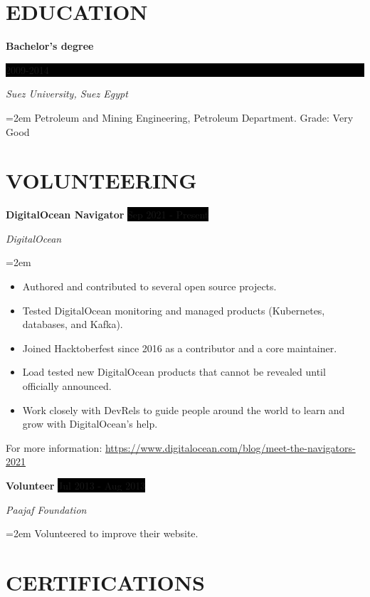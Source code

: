 \documentclass[paper=a4,fontsize=11pt]{scrartcl} %
\newcommand{\sepspace}{\vspace*{1em}}		%
\newcommand{\NewPart}[1]{\section*{\uppercase{#1}}}
\newcommand{\EducationEntry}[4]{
		\noindent \textbf{#1} \hfill      %
		\colorbox{Black}{%
			\parbox{6em}{%
			\hfill\color{White}#2}} \par  %
		\noindent \textit{#3} \par        %
		\noindent\hangindent=2em\hangafter=0 \small #4 %
		\normalsize \par}
\newcommand{\WorkEntry}[4]{				  %
		\noindent \textbf{#1} \hfill      %
		\colorbox{Black}{\color{White}#2} \par  %
		\noindent \textit{#3} \par              %
		\noindent\hangindent=2em\hangafter=0 \small #4 %
		\normalsize \par}
\begin{document}
\NewPart{Education}{}

\EducationEntry{Bachelor's degree}{2009-2014}{Suez University, Suez Egypt}{Petroleum and Mining Engineering, Petroleum Department. Grade: Very Good}


\NewPart{Volunteering}{}

\WorkEntry{DigitalOcean Navigator}{Sep 2021 - Present}{DigitalOcean}{\begin{itemize}
\item Authored and contributed to several open source projects.
\item Tested DigitalOcean monitoring and managed products (Kubernetes, databases, and Kafka).
\item Joined Hacktoberfest since 2016 as a contributor and a core maintainer.
\item Load tested new DigitalOcean products that cannot be revealed until officially announced.
\item Work closely with DevRels to guide people around the world to learn and grow with DigitalOcean's help.
\end{itemize}
For more information: \url{https://www.digitalocean.com/blog/meet-the-navigators-2021}}
\sepspace

\WorkEntry{Volunteer}{Jul 2013 - Aug 2013}{Paajaf Foundation}{Volunteered to improve their website.}


\NewPart{Certifications}{}
\end{document}
